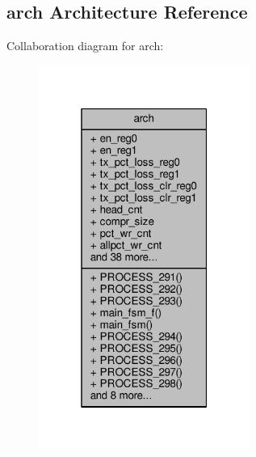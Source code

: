 \subsection{arch Architecture Reference}
\label{classrx__pct__data__v2_1_1arch}


Collaboration diagram for arch\+:\nopagebreak
\begin{figure}[H]
\begin{center}
\leavevmode
\includegraphics[width=196pt]{df/d08/classrx__pct__data__v2_1_1arch__coll__graph}
\end{center}
\end{figure}
